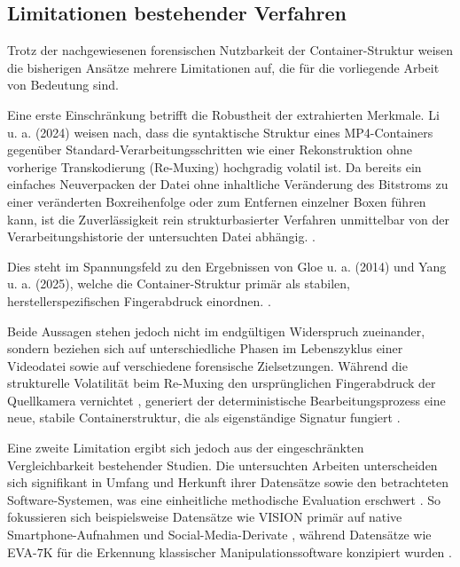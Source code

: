 
\subsection{Limitationen bestehender Verfahren}

Trotz der nachgewiesenen forensischen Nutzbarkeit der Container-Struktur weisen die bisherigen Ansätze mehrere Limitationen auf, die für die vorliegende Arbeit von Bedeutung sind.

Eine erste Einschränkung betrifft die Robustheit der extrahierten Merkmale. Li u. a. (2024) weisen nach, dass die syntaktische Struktur eines MP4-Containers gegenüber Standard-Verarbeitungsschritten wie einer Rekonstruktion ohne vorherige Transkodierung (Re-Muxing) hochgradig volatil ist. Da bereits ein einfaches Neuverpacken der Datei ohne inhaltliche Veränderung des Bitstroms zu einer veränderten Boxreihenfolge oder zum Entfernen einzelner Boxen führen kann, ist die Zuverlässigkeit rein strukturbasierter Verfahren unmittelbar von der Verarbeitungshistorie der untersuchten Datei abhängig. \cite[Kap. I]{li_learning_2024}. 

Dies steht im Spannungsfeld zu den Ergebnissen von Gloe u. a. (2014) und Yang u. a. (2025), welche die Container-Struktur primär als stabilen, herstellerspezifischen Fingerabdruck einordnen. \cite{gloe_forensic_2014}\cite{yang_comprehensive_2025}.

Beide Aussagen stehen jedoch nicht im endgültigen Widerspruch zueinander, sondern beziehen sich auf unterschiedliche Phasen im Lebenszyklus einer Videodatei sowie auf verschiedene forensische Zielsetzungen. Während die strukturelle Volatilität beim Re-Muxing den ursprünglichen Fingerabdruck der Quellkamera vernichtet \cite[Kap. I]{li_learning_2024}\cite[Kap. III.A]{iuliani_video_2019}, generiert der deterministische Bearbeitungsprozess eine neue, stabile Containerstruktur, die als eigenständige Signatur fungiert \cite[S. S71--S72, S74]{gloe_forensic_2014}.

Eine zweite Limitation ergibt sich jedoch aus der eingeschränkten Vergleichbarkeit bestehender Studien. Die untersuchten Arbeiten unterscheiden sich signifikant in Umfang und Herkunft ihrer Datensätze sowie den betrachteten Software-Systemen, was eine einheitliche methodische Evaluation erschwert \cite[Tab. 6]{yang_comprehensive_2025}. So fokussieren sich beispielsweise Datensätze wie VISION primär auf native Smartphone-Aufnahmen und Social-Media-Derivate \cite[Kap. 1]{shullani_vision_2017}, während Datensätze wie EVA-7K für die Erkennung klassischer Manipulationssoftware konzipiert wurden \cite[Kap. 1]{yang_efficient_2020}.

